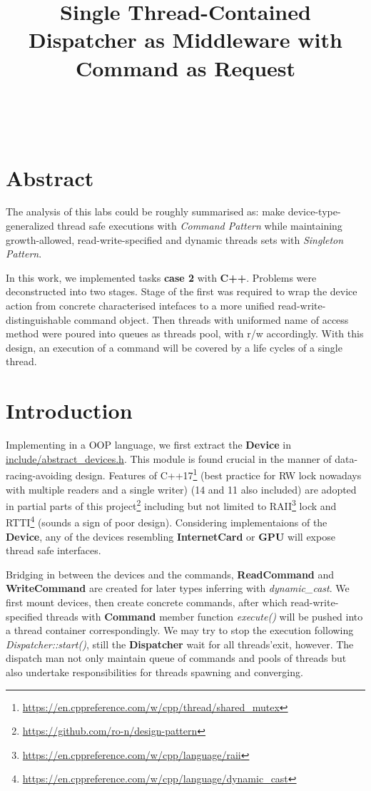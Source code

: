 \documentclass[a4paper]{article}
\title{Single Thread-Contained Dispatcher as Middleware with Command as Request}
\makeatletter
\renewcommand{\maketitle}{\bgroup\setlength{\parindent}{0pt}
    \begin{center}

        \textbf{\huge\@title} \\[12pt]


        \par\vspace{\baselineskip}
    \end{center}

\egroup}
\makeatother
\begin{document}
\maketitle

\section{Abstract}%
\label{sec:abstract}

The analysis of this labs could be roughly summarised as:
make device-type-generalized thread safe executions with \textit{Command Pattern} while
maintaining growth-allowed, read-write-specified and dynamic threads sets with
\textit{Singleton Pattern}.

In this work, we implemented tasks \textbf{case 2} with \textbf{C++}. Problems
were deconstructed into two stages. Stage of the first was
required to wrap the device action from concrete characterised
intefaces to a more unified read-write-distinguishable command
object. Then threads with uniformed name of access method were poured into
queues as threads pool, with r/w accordingly. With this design,
an execution of a command will be covered by a
life cycles of a single thread.

\section{Introduction}%
\label{sec:introduction}

Implementing in a OOP language, we first extract the \textbf{Device} in
\underline{include/abstract\_devices.h}. This module is found crucial
in the manner of data-racing-avoiding design. Features of C++17\footnote{
\url{https://en.cppreference.com/w/cpp/thread/shared\_mutex}}
(best practice for RW lock nowadays with multiple readers and a single writer)
(14 and 11 also included)
are adopted in partial parts of this project\footnote{
\url{https://github.com/ro-n/design-pattern}}
including but not limited to
RAII\footnote{\url{https://en.cppreference.com/w/cpp/language/raii}} lock and RTTI\footnote{
\url{https://en.cppreference.com/w/cpp/language/dynamic\_cast}} (sounds a sign of poor design).
Considering implementaions of the \textbf{Device}, any of the devices resembling
\textbf{InternetCard} or \textbf{GPU} will expose thread safe interfaces.

Bridging in between the devices and the commands, \textbf{ReadCommand} and
\textbf{WriteCommand} are created for later types inferring with \textsl{dynamic\_cast}.
We first mount devices, then create concrete commands,
after which read-write-specified threads with \textbf{Command} member function \textsl{execute()}
will be pushed into a thread container correspondingly. We may try to stop the execution
following \textsl{Dispatcher::start()}, still the \textbf{Dispatcher} wait for all threads'exit, however.
The dispatch man not only maintain queue of commands and pools of threads but also
undertake responsibilities for threads spawning and converging.
\end{document}
